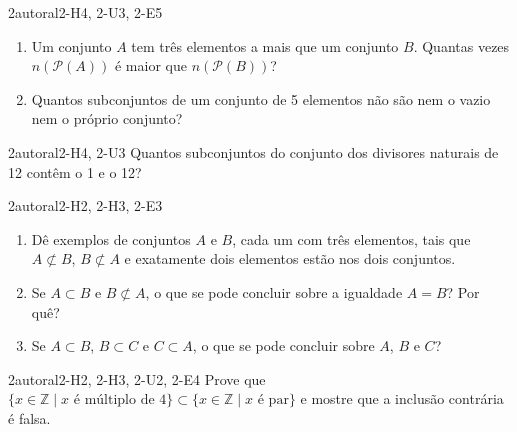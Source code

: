 \begin{questao}{2}{autoral}{2-H4, 2-U3, 2-E5}\label{u2:contar}
\begin{enumerate}[label=\alph*)]
  \item Um conjunto $A$ tem três elementos a mais que um conjunto $B$. Quantas vezes $n(\mathcal{P}(A))$ é maior que $n(\mathcal{P}(B))$?
  \item Quantos subconjuntos de um conjunto de 5 elementos não são nem o vazio nem o próprio conjunto?
\end{enumerate}
\end{questao}

\begin{questao}[integradora]{2}{autoral}{2-H4, 2-U3}\label{u2:divisores}
Quantos subconjuntos do conjunto dos divisores naturais de 12 contêm o 1 e o 12?
\end{questao}

\begin{questao}{2}{autoral}{2-H2, 2-H3, 2-E3}\label{u2:exemplos}
\begin{enumerate}[label=\alph*)]
  \item Dê exemplos de conjuntos $A$ e $B$, cada um com três elementos, tais que $A\not\subset B$, $B\not\subset A$ e exatamente dois elementos estão nos dois conjuntos.
  \item Se $A\subset B$ e $B\not\subset A$, o que se pode concluir sobre a igualdade $A=B$? Por quê?
  \item Se $A\subset B$, $B\subset C$ e $C\subset A$, o que se pode concluir sobre $A$, $B$ e $C$?
\end{enumerate}
\end{questao}

\begin{questao}{2}{autoral}{2-H2, 2-H3, 2-U2, 2-E4}\label{u2:multiplos4}
Prove que $\{x\in\mathbb{Z}\mid x\text{ é múltiplo de 4}\}\subset\{x\in\mathbb{Z}\mid x\text{ é par}\}$ e mostre que a inclusão contrária é falsa.
\end{questao}

